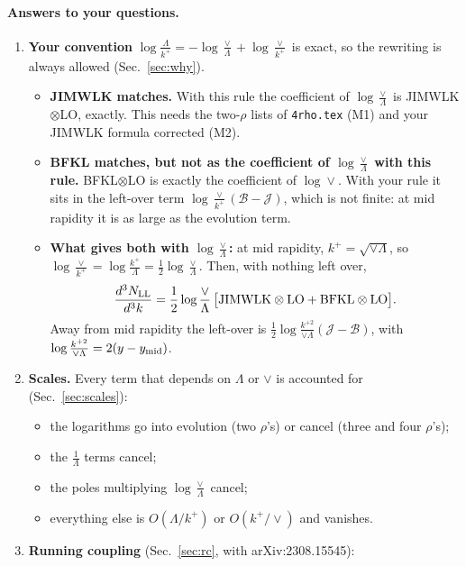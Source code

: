 \documentclass[10pt]{article}
\numberwithin{equation}{section}
\begin{document}
\paragraph{Answers to your questions.}
\begin{enumerate}
\item \textbf{Your convention} $\log\frac{\Lambda}{k^+}=-\log\frac{\vee}{\Lambda}+\log\frac{\vee}{k^+}$ is exact, so the rewriting is always allowed (Sec.~\ref{sec:why}).
\begin{itemize}
\item \textbf{JIMWLK matches.} With this rule the coefficient of $\log\frac{\vee}{\Lambda}$ is JIMWLK$\otimes$LO, exactly. This needs the two-$\rho$ lists of \texttt{4rho.tex} (M1) and your JIMWLK formula corrected (M2).
\item \textbf{BFKL matches, but not as the coefficient of $\log\frac{\vee}{\Lambda}$ with this rule.} BFKL$\otimes$LO is exactly the coefficient of $\log\vee$. With your rule it sits in the left-over term $\log\frac{\vee}{k^+}(\mathcal B-\mathcal J)$, which is not finite: at mid rapidity it is as large as the evolution term.
\item \textbf{What gives both with $\log\frac{\vee}{\Lambda}$:} at mid rapidity, $k^+=\sqrt{\vee\Lambda}$, so $\log\frac{\vee}{k^+}=\log\frac{k^+}{\Lambda}=\frac12\log\frac{\vee}{\Lambda}$. Then, with nothing left over,
\begin{equation*}
\frac{d^3N_{\rm LL}}{d^3k}=\frac12\log\frac{\vee}{\Lambda}\,\big[{\rm JIMWLK}\otimes{\rm LO}+{\rm BFKL}\otimes{\rm LO}\big].
\end{equation*}
Away from mid rapidity the left-over is $\frac12\log\frac{k^{+2}}{\vee\Lambda}(\mathcal J-\mathcal B)$, with $\log\frac{k^{+2}}{\vee\Lambda}=2(y-y_{\rm mid})$.
\end{itemize}
\item \textbf{Scales.} Every term that depends on $\Lambda$ or $\vee$ is accounted for (Sec.~\ref{sec:scales}):
\begin{itemize}
\item the logarithms go into evolution (two $\rho$'s) or cancel (three and four $\rho$'s);
\item the $\frac1\Lambda$ terms cancel;
\item the poles multiplying $\log\frac{\vee}{\Lambda}$ cancel;
\item everything else is $O(\Lambda/k^+)$ or $O(k^+/\vee)$ and vanishes.
\end{itemize}
\item \textbf{Running coupling} (Sec.~\ref{sec:rc}, with arXiv:2308.15545):

\end{enumerate}
\end{document}
